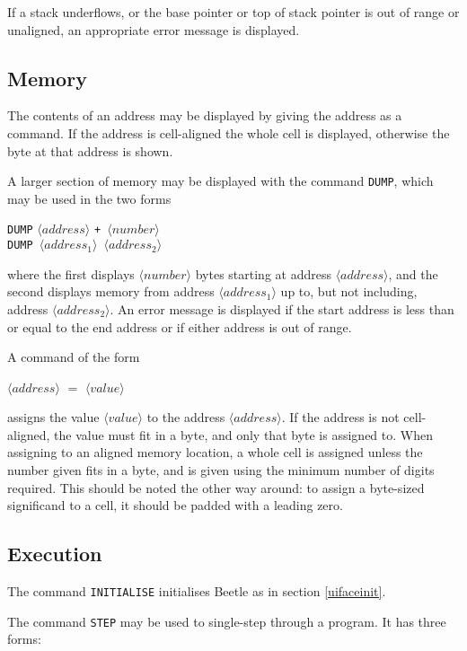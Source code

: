 \documentclass{article}
\newcommand{\angb}[1]{$\langle #1\rangle$}
\begin{document}
If a stack underflows, or the base pointer or top of stack pointer is out of
range or unaligned, an appropriate error message is displayed.

\subsection{Memory}

The contents of an address may be displayed by giving the address as a
command. If the address is cell-aligned the whole cell is displayed,
otherwise the byte at that address is shown.

A larger section of memory may be displayed with the command {\tt DUMP},
which may be used in the two forms

\begin{center}
{\tt DUMP} \angb{address} \tt{+} \angb{number}\\
{\tt DUMP} \angb{address_1} \angb{address_2}
\end{center}

where the first displays \angb{number} bytes starting at address
\angb{address}, and the second displays memory from address \angb{address_1}
up to, but not including, address \angb{address_2}. An error message is
displayed if the start address is less than or equal to the end address or if
either address is out of range.

A command of the form

\begin{center}\angb{address} $=$ \angb{value}\end{center}

assigns the value \angb{value} to the address \angb{address}. If the address
is not cell-aligned, the value must fit in a byte, and only that byte is
assigned to. When assigning to an aligned memory location, a whole cell is
assigned unless the number given fits in a byte, and is given using the
minimum number of digits required. This should be noted the other way around:
to assign a byte-sized significand to a cell, it should be padded with a
leading zero.

\subsection{Execution}

The command {\tt INITIALISE} initialises Beetle as in section
\ref{uifaceinit}.

The command {\tt STEP} may be used to single-step through a program. It has
three forms:
\end{document}
